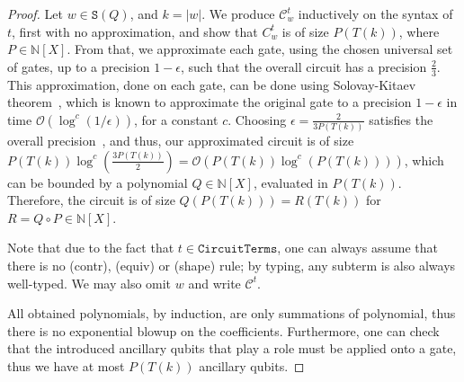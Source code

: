 \documentclass[10pt,a4paper]{article}
\newcommand{\circuittype}{\ensuremath{\mathtt{CircuitTerms}}}
\newcommand{\shapeset}[1]{\mathtt{S}(#1)}
\newcommand{\size}[1]{|#1|}
\newcommand{\bigo}[1]{\mathcal O({#1})}
\newcommand{\mbN}{\mathbb N}
\newcommand{\mcC}{\mathcal C}
\begin{document}
\begin{proof}
  Let $w \in \shapeset Q$, and $k = \size w$. We produce $\mcC_w^t$
  inductively on the syntax of $t$, first with no approximation, and show that
  $C_w^t$ is of size $P(T(k))$, where $P \in \mbN[X]$.
  From that, we approximate each gate, using the
  chosen universal set of gates, up to a precision $1 - \epsilon$, such that the
  overall circuit has a precision $\frac 2 3$. This approximation, done on each
  gate, can be done using Solovay-Kitaev theorem~\cite{Kit97}, which is known to
  approximate the original gate to a precision $1 - \epsilon$ in time
  $\bigo{\log^c(1/\epsilon)}$, for a constant $c$. Choosing $\epsilon = \frac 2
  {3P(T(k))}$ satisfies the overall precision~\cite{NC12}, and thus, our
  approximated circuit is of size $P(T(k)) \log^c(\frac {3 P(T(k))} 2) =
  \bigo{P(T(k)) \log^c(P(T(k)))}$, which can be bounded by a polynomial $Q \in
  \mbN[X]$, evaluated in $P(T(k))$. Therefore, the circuit is of size
  $Q(P(T(k))) = R(T(k))$ for $R = Q \circ P \in \mbN[X]$.

  Note that due to the fact that $t \in \circuittype$, one can
  always assume that there is no (contr), (equiv) or (shape) rule; by typing,
  any subterm is also always well-typed.
  We may also omit $w$ and write $\mcC^t$.

  All obtained polynomials, by induction, are only summations of polynomial,
  thus there is no exponential blowup on the coefficients. Furthermore, one can
  check that the introduced ancillary qubits that play a role must be applied
  onto a gate, thus we have at most $P(T(k))$ ancillary qubits.


\end{proof}
\end{document}
